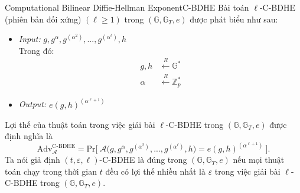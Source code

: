 \documentclass[class=report, crop=false]{standalone}
\begin{document}
			\begin{problem}{Computational Bilinear Diffie-Hellman Exponent}{C-BDHE}
				Bài toán $\ell$-C-BDHE (phiên bản đối xứng) $(\ell \geq 1)$ trong $(\mathbb{G}, \mathbb{G}_T, e)$ được phát biểu như sau:
				\vspace{-\baselineskip}
				\begin{itemize}[leftmargin=1.5cm, itemindent=-0.5cm]
					\item[] \textit{Input:} $g, g^\alpha, g^{(\alpha^2)}, ..., g^{(\alpha^\ell)}, h$ \\
					Trong đó: \vspace{-\baselineskip}
					\begin{align*}
						g, h 	&\xleftarrow{R} \mathbb{G}^* \\
						\alpha 	&\xleftarrow{R} \mathbb{Z}_p^*
					\end{align*}
					\item[] \textit{Output:} $e(g, h)^{(\alpha^{\ell + 1})}$
				\end{itemize}
				\vspace{-\baselineskip}\par
				Lợi thế của thuật toán \algo trong việc giải bài $\ell$-C-BDHE trong $(\mathbb{G}, \mathbb{G}_T, e)$ được định nghĩa là
				\[
					\text{Adv}_{\mathcal{A}}^{\text{C-BDHE}} = \text{Pr}\bigg[ \ \mathcal{A}\Big(g, g^\alpha, g^{(\alpha^2)}, ..., g^{(\alpha^\ell)}, h \Big) = e(g, h)^{(\alpha^{\ell + 1})} \ \bigg].
				\] \indent
				Ta nói giả định $(t, \varepsilon, \ell)$-C-BDHE là đúng trong $(\mathbb{G}, \mathbb{G}_T, e)$ nếu mọi thuật toán chạy trong thời gian $t$ đều có lợi thế nhiều nhất là $\varepsilon$ trong việc giải bài $\ell$-C-BDHE trong $(\mathbb{G}, \mathbb{G}_T, e)$.
			\end{problem}
\end{document}
